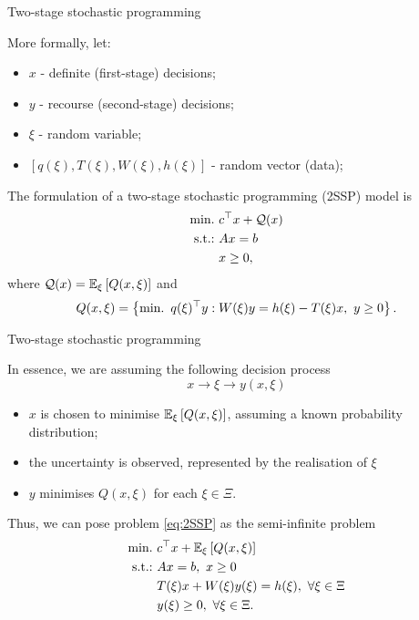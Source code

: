 \begin{frame}{Two-stage stochastic programming}

	More formally, let:
	\vspace{-6pt}
	\begin{itemize}
		\item $x$ - definite (first-stage) decisions; 
		\item $y$ - recourse (second-stage) decisions;
		\item $\xi$ - \alert{random} variable;
		\item $[q(\xi), T(\xi), W(\xi), h(\xi)]$ - random vector (data);  	
	\end{itemize}
	
	\pause
	The formulation of a \alert{two-stage stochastic programming (2SSP)} model is
	\begin{subequations} \label{eq:2SSP}
		\begin{align}
			\mathop{\text{min.} \ } & c^\top x + \mathcal{Q}(x) \\
			\mathop{\text{s.t.:} \ }  & Ax = b \\
			     & x \ge 0, 
		\end{align}
	\end{subequations}
	where $\mathcal{Q}(x) = \mathbb{E}_\xi\left[ Q(x, \xi) \right]$ and
	\begin{equation} \label{eq:2stage}
		Q(x, \xi) = \left\{ \mathop{\text{min.} \ } q(\xi)^\top y : W(\xi)y = h(\xi) - T(\xi)x, \ y \ge 0 \right \}.
	\end{equation}

\end{frame}


\begin{frame}{Two-stage stochastic programming}

	In essence, we are assuming the following \alert{decision process}
	$$
	 x \rightarrow \xi \rightarrow y(x, \xi)
	$$	
	\vspace{-12pt}
	\begin{itemize}
		\item $x$ is chosen to minimise $\mathbb{E}_\xi\left[ Q(x, \xi) \right]$, assuming a \alert{known} probability distribution;
		\item the uncertainty is \alert{observed}, represented by the realisation of $\xi$
		\item $y$ minimises $Q(x, \xi)$ for each $\xi \in \Xi$.	
	\end{itemize}
	\pause
	Thus, we can pose problem \eqref{eq:2SSP} as the \alert{semi-infinite} problem
	\begin{subequations} \label{eq:2SSP_2}
	\begin{align}
		\mathop{\text{min.} \ }  & c^\top x + \mathbb{E}_\xi\left[ Q(x, \xi) \right] \\
		\mathop{\text{s.t.:} \ }	   & Ax = b, \ x \ge 0 \\
			   & T(\xi)x + W(\xi)y(\xi) = h(\xi), \ \forall \xi \in \Xi \\
			   & y(\xi) \ge 0, \ \forall \xi \in \Xi.
	\end{align}
	\end{subequations}

\end{frame}


